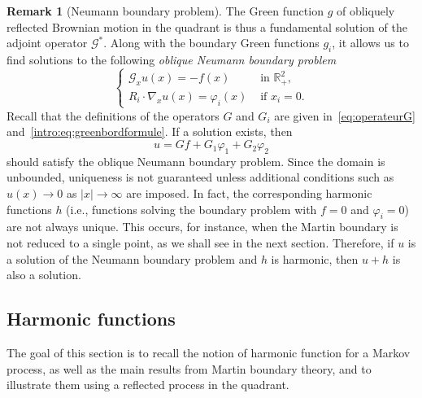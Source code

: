 \documentclass[11pt]{article}
\theoremstyle{definition}
\newtheorem{rem}[thm]{Remark}
\begin{document}
\begin{rem}[Neumann boundary problem]
\label{rem:neumannprob}
The Green function $g$ of obliquely reflected Brownian motion in the quadrant is thus a fundamental solution of the adjoint operator $\mathcal{G}^*$. Along with the boundary Green functions $g_i$, it allows us to find solutions to the following \emph{oblique Neumann boundary problem}
$$
\begin{cases}\mathcal{G}_x u(x)=-f(x) & \text { in } \mathbb{R}_{+}^2, \\ R_i \cdot \nabla_x u(x)=\varphi_i(x) & \text { if } x_i=0. \end{cases}
$$
Recall that the definitions of the operators $G$ and $G_i$ are given in~\eqref{eq:operateurG} and~\eqref{intro:eq:greenbordformule}. If a solution exists, then
$$
u=G f+G_1 \varphi_1+G_2 \varphi_2 
$$
should satisfy the oblique Neumann boundary problem. Since the domain is unbounded, uniqueness is not guaranteed unless additional conditions such as $u(x)\to 0$ as $|x|\to \infty$ are imposed. In fact, the corresponding harmonic functions $h$ (i.e., functions solving the boundary problem with $f=0$ and $\varphi_i=0$) are not always unique. This occurs, for instance, when the Martin boundary is not reduced to a single point, as we shall see in the next section. Therefore, if $u$ is a solution of the Neumann boundary problem and $h$ is harmonic, then $u+h$ is also a solution.
\end{rem}

\subsection{Harmonic functions}
\label{sec:martharm}

The goal of this section is to recall the notion of harmonic function for a Markov process, as well as the main results from Martin boundary theory, and to illustrate them using a reflected process in the quadrant.
\end{document}
